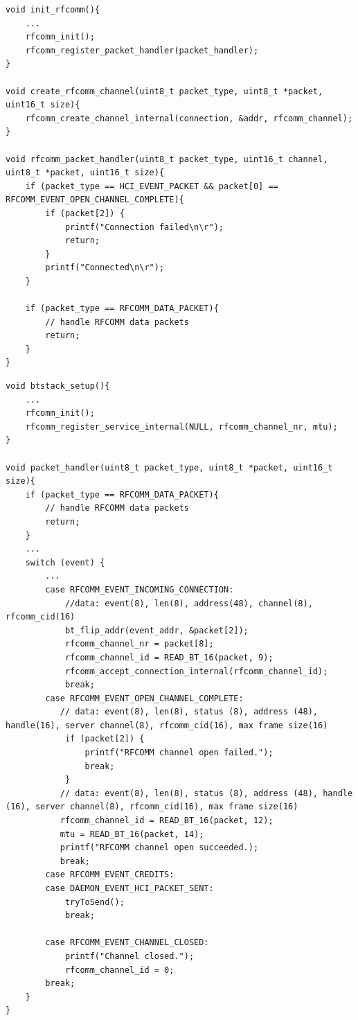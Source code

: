 \documentclass[a4paper,titlepage,oneside,12pt]{amsart} %
\begin{document}
\begin{lstlisting}[float, caption=RFCOMM handler for outgoing RFCOMM channel., label=RFCOMMremoteService] 
void init_rfcomm(){
    ...
    rfcomm_init();
    rfcomm_register_packet_handler(packet_handler);
}

void create_rfcomm_channel(uint8_t packet_type, uint8_t *packet, uint16_t size){
    rfcomm_create_channel_internal(connection, &addr, rfcomm_channel);
}

void rfcomm_packet_handler(uint8_t packet_type, uint16_t channel, uint8_t *packet, uint16_t size){
    if (packet_type == HCI_EVENT_PACKET && packet[0] == RFCOMM_EVENT_OPEN_CHANNEL_COMPLETE){
        if (packet[2]) {
            printf("Connection failed\n\r");
            return;
        }
        printf("Connected\n\r");
    }
    
    if (packet_type == RFCOMM_DATA_PACKET){
        // handle RFCOMM data packets
        return;
    }
}
\end{lstlisting}

\begin{lstlisting}[float, caption=Providing RFCOMM service., label=RFCOMMService]
void btstack_setup(){
    ...
    rfcomm_init();
    rfcomm_register_service_internal(NULL, rfcomm_channel_nr, mtu); 
}

void packet_handler(uint8_t packet_type, uint8_t *packet, uint16_t size){
    if (packet_type == RFCOMM_DATA_PACKET){
        // handle RFCOMM data packets
        return;
    }
    ...
    switch (event) {
        ...
        case RFCOMM_EVENT_INCOMING_CONNECTION:
            //data: event(8), len(8), address(48), channel(8), rfcomm_cid(16)
            bt_flip_addr(event_addr, &packet[2]); 
            rfcomm_channel_nr = packet[8];
            rfcomm_channel_id = READ_BT_16(packet, 9);
            rfcomm_accept_connection_internal(rfcomm_channel_id);
            break;
        case RFCOMM_EVENT_OPEN_CHANNEL_COMPLETE:
           // data: event(8), len(8), status (8), address (48), handle(16), server channel(8), rfcomm_cid(16), max frame size(16)
            if (packet[2]) {
                printf("RFCOMM channel open failed.");
                break;
            } 
           // data: event(8), len(8), status (8), address (48), handle (16), server channel(8), rfcomm_cid(16), max frame size(16)
           rfcomm_channel_id = READ_BT_16(packet, 12);
           mtu = READ_BT_16(packet, 14);
           printf("RFCOMM channel open succeeded.);
           break;
        case RFCOMM_EVENT_CREDITS:
        case DAEMON_EVENT_HCI_PACKET_SENT:
            tryToSend();
            break;

        case RFCOMM_EVENT_CHANNEL_CLOSED:
            printf("Channel closed.");
            rfcomm_channel_id = 0;
        break;
    }
}
\end{lstlisting}
\end{document}

